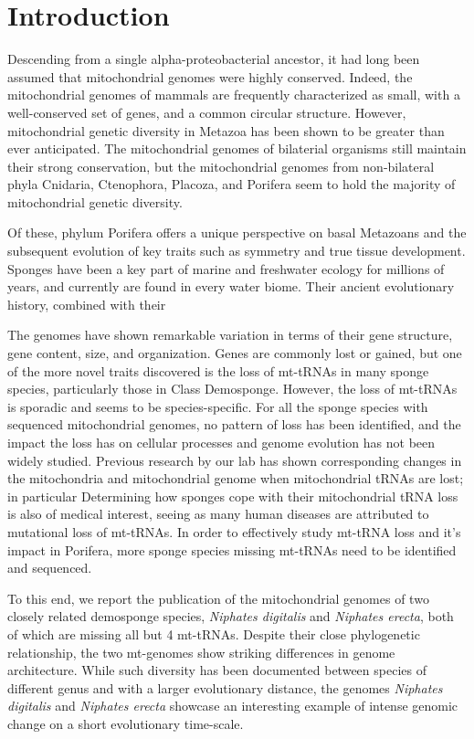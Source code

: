 \documentclass[../main.tex]{subfiles}
\begin{document}
\newpage
\section{Introduction}
Descending from a single alpha-proteobacterial ancestor, it had long been assumed that mitochondrial genomes were highly conserved. Indeed, the mitochondrial genomes of mammals are frequently characterized as small, with a well-conserved set of genes, and a common circular structure. However,  mitochondrial genetic diversity in Metazoa has been shown to be greater than ever anticipated. The mitochondrial genomes of bilaterial organisms still maintain their strong conservation, but the mitochondrial genomes from non-bilateral phyla Cnidaria, Ctenophora, Placoza, and Porifera seem to hold the majority of mitochondrial genetic diversity. 

 Of these, phylum Porifera offers a unique perspective on basal Metazoans and the subsequent evolution of key traits such as symmetry and true tissue development. Sponges have been a key part of marine and freshwater ecology for millions of years, and currently are found in every water biome. Their ancient evolutionary history, combined with their 
 
The genomes have shown remarkable variation in terms of their gene structure, gene content, size, and organization. Genes are commonly lost or gained, but one of the more novel traits discovered is the loss of mt-tRNAs in many sponge species, particularly those in Class Demosponge. However, the loss of mt-tRNAs is sporadic and seems to be species-specific. For all the sponge species with sequenced mitochondrial genomes, no pattern of loss has been identified, and the impact the loss has on cellular processes and genome evolution has not been widely studied. Previous research by our lab has shown corresponding changes in the mitochondria and mitochondrial genome when mitochondrial tRNAs are lost; in particular Determining how sponges cope with their mitochondrial tRNA loss is also of medical interest, seeing as many human diseases are attributed to mutational loss of mt-tRNAs. In order to effectively study mt-tRNA loss and it's impact in Porifera, more sponge species missing mt-tRNAs need to be identified and sequenced.

To this end, we report the publication of the mitochondrial genomes of two closely related demosponge species, \emph{Niphates digitalis} and \emph{Niphates erecta}, both of which are missing all but 4 mt-tRNAs. Despite their close phylogenetic relationship, the two mt-genomes show striking differences in genome architecture. While such diversity has been documented between species of different genus and with a larger evolutionary distance, the genomes \emph{Niphates digitalis} and \emph{Niphates erecta} showcase an interesting example of intense genomic change on a short evolutionary time-scale. 
\end{document}
